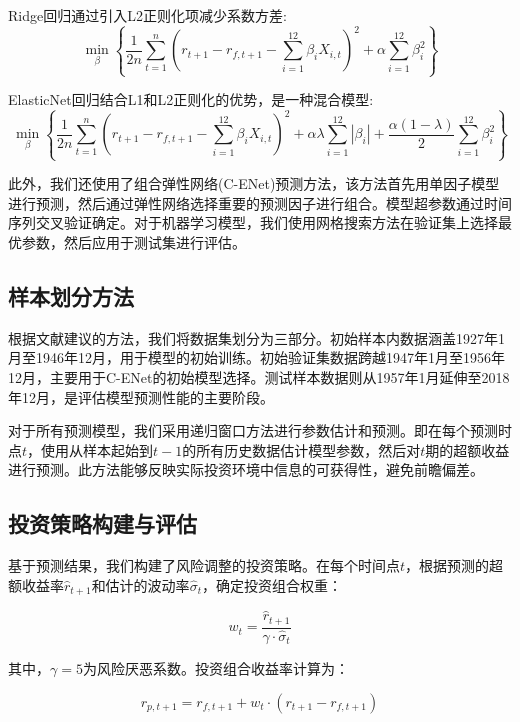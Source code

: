 \documentclass[12pt, a4paper]{article}
\begin{document}
Ridge回归通过引入L2正则化项减少系数方差:
\begin{equation}
\min_{\beta} \left\{ \frac{1}{2n}\sum_{t=1}^{n}(r_{t+1} - r_{f,t+1} - \sum_{i=1}^{12}\beta_i X_{i,t})^2 + \alpha\sum_{i=1}^{12}\beta_i^2 \right\}
\end{equation}

ElasticNet回归结合L1和L2正则化的优势，是一种混合模型:
\begin{equation}
\min_{\beta} \left\{ \frac{1}{2n}\sum_{t=1}^{n}(r_{t+1} - r_{f,t+1} - \sum_{i=1}^{12}\beta_i X_{i,t})^2 + \alpha\lambda\sum_{i=1}^{12}|\beta_i| + \frac{\alpha(1-\lambda)}{2}\sum_{i=1}^{12}\beta_i^2 \right\}
\end{equation}

此外，我们还使用了组合弹性网络(C-ENet)预测方法，该方法首先用单因子模型进行预测，然后通过弹性网络选择重要的预测因子进行组合。模型超参数通过时间序列交叉验证确定。对于机器学习模型，我们使用网格搜索方法在验证集上选择最优参数，然后应用于测试集进行评估。

\subsection{样本划分方法}

根据文献建议的方法，我们将数据集划分为三部分。初始样本内数据涵盖1927年1月至1946年12月，用于模型的初始训练。初始验证集数据跨越1947年1月至1956年12月，主要用于C-ENet的初始模型选择。测试样本数据则从1957年1月延伸至2018年12月，是评估模型预测性能的主要阶段。

对于所有预测模型，我们采用递归窗口方法进行参数估计和预测。即在每个预测时点$t$，使用从样本起始到$t-1$的所有历史数据估计模型参数，然后对$t$期的超额收益进行预测。此方法能够反映实际投资环境中信息的可获得性，避免前瞻偏差。

\subsection{投资策略构建与评估}

基于预测结果，我们构建了风险调整的投资策略。在每个时间点$t$，根据预测的超额收益率$\hat{r}_{t+1}$和估计的波动率$\hat{\sigma}_t$，确定投资组合权重：

\begin{equation}
w_t = \frac{\hat{r}_{t+1}}{\gamma \cdot \hat{\sigma}_t}
\end{equation}

其中，$\gamma = 5$为风险厌恶系数。投资组合收益率计算为：

\begin{equation}
r_{p,t+1} = r_{f,t+1} + w_t \cdot (r_{t+1} - r_{f,t+1})
\end{equation}
\end{document}
